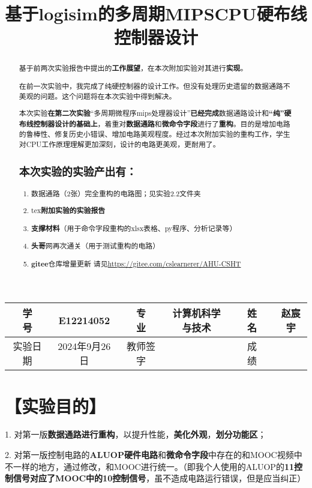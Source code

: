 \documentclass[withoutpreface]{cumcmthesis}
\title{基于logisim的多周期MIPSCPU硬布线控制器设计}
\begin{document}
\maketitle
\begin{tabular}{cccccc}
	\hline
	学　　号 & E12214052 &专　　业 & 计算机科学与技术 &姓　　名 & 赵宸宇 \\
	\hline
	实验日期 & 2024年9月26日 &教师签字 &  &成　　绩&\\
	\hline
\end{tabular}
\begin{abstract}
	基于前两次实验报告中提出的\textbf{工作展望}，在本次附加实验对其进行\textbf{实现}。
		
	在前一次实验中，我完成了纯硬控制器的设计工作。但没有处理历史遗留的数据通路不美观的问题。这个问题将在本次实验中得到解决。
	
	本次实验\textbf{在第二次实验}“多周期微程序mips处理器设计”\textbf{已经完成}数据通路设计和\textbf{“纯”硬布线控制器设计的基础上}，着重对\textbf{数据通路}和\textbf{微命令字段}进行了\textbf{重构}。目的是增加电路的鲁棒性、修复历史小错误、增加电路美观程度。经过本次附加实验的重构工作，学生对CPU工作原理理解更加深刻，设计的电路更美观，更耐用了。

\subsection*{本次实验的实验产出有：}
\begin{enumerate}
	\item 数据通路（2张）完全重构的电路图；见实验2.2文件夹
	\item tex\textbf{附加实验的实验报告}
	\item \textbf{支撑材料}（用于命令字段重构的xlsx表格、py程序、分析记录等）
	\item \textbf{头哥}网再次通关（用于测试重构的电路）
	\item \textbf{gitee}仓库增量更新 请见\url{https://gitee.com/cslearnerer/AHU-CSHT}
\end{enumerate}
\end{abstract}
\tableofcontents
\newpage
\section{【实验目的】}
1. 对第一版\textbf{数据通路进行重构}，以提升性能，\textbf{美化外观}，\textbf{划分功能区}；

2. 对第一版控制电路的\textbf{ALUOP硬件电路}和\textbf{微命令字段}中存在的和MOOC视频中不一样的地方，通过修改，和MOOC进行统一。（即我个人使用的ALUOP的\textbf{11控制信号对应了MOOC中的10控制信号}，虽不造成电路运行错误，但是应当纠正）
\end{document}
